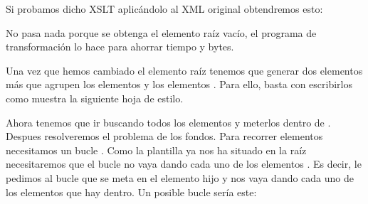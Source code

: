 \documentclass[letterpaper,10pt,spanish]{sphinxmanual}
\begin{document}
Si probamos dicho XSLT aplicándolo al XML original obtendremos esto:

\begin{sphinxVerbatim}[commandchars=\\\{\}]
\end{sphinxVerbatim}

No pasa nada porque se obtenga el elemento raíz vacío, el programa de transformación lo hace para ahorrar tiempo y bytes.

Una vez que hemos cambiado el elemento raíz tenemos que generar dos elementos más que agrupen los elementos  y los elementos . Para ello, basta con escribirlos como muestra la siguiente hoja de estilo.

\begin{sphinxVerbatim}[commandchars=\\\{\}]
 
 
\end{sphinxVerbatim}

Ahora tenemos que ir buscando todos los elementos  y meterlos dentro de . Despues resolveremos el problema de los fondos. Para recorrer elementos necesitamos un bucle . Como la plantilla ya nos ha situado en la raíz necesitaremos que el bucle no vaya dando cada uno de los elementos . Es decir, le pedimos al bucle que se meta en el elemento hijo  y nos vaya dando cada uno de los elementos  que hay dentro. Un posible bucle sería este:
\end{document}
